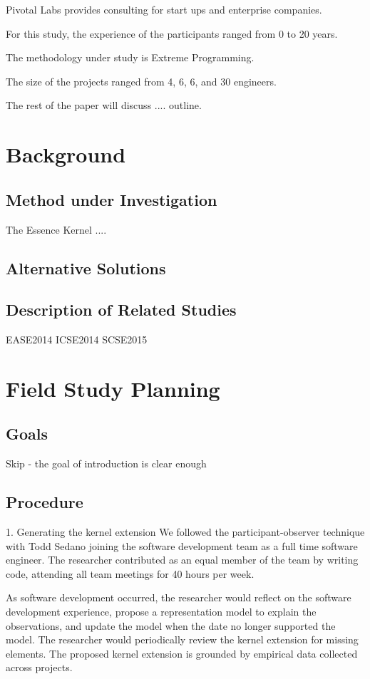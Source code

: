 \documentclass[preprint,12pt,3p]{elsarticle}
\begin{document}
Pivotal Labs provides consulting for start ups and enterprise companies.

For this study, the experience of the participants ranged from 0 to 20 years.

The methodology under study is Extreme Programming.

The size of the projects ranged from 4, 6, 6, and 30 engineers.

The rest of the paper will discuss .... outline.


\section{Background}

\subsection{Method under Investigation}
The Essence Kernel ....

\subsection{Alternative Solutions}

\subsection{Description of Related Studies}

EASE2014
ICSE2014
SCSE2015

\section{Field Study Planning} 

\subsection{Goals}
Skip - the goal of introduction is clear enough

\subsection{Procedure}
1. Generating the kernel extension
We followed the participant-observer technique with Todd Sedano joining the software development team as a full time software engineer. The researcher contributed as an equal member of the team by writing code, attending all team meetings for 40 hours per week. 

As software development occurred, the researcher would reflect on the software development experience, propose a representation model to explain the observations, and update the model when the date no longer supported the model.  The researcher would periodically review the kernel extension for missing elements. The proposed kernel extension is grounded by empirical data collected across projects. 
\end{document}
